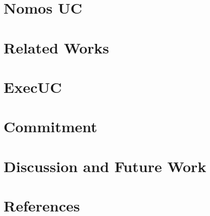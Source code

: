 \documentclass[conference]{IEEEtran}
\begin{document}
\section{Nomos UC} \label{sec:nomosuc}


\section{Related Works}


%

\section{ExecUC} \label{sec:execuc}


\section{Commitment} \label{sec:commitment}


%

%
%
%

\section{Discussion and Future Work}


\section*{References}




\end{document}
